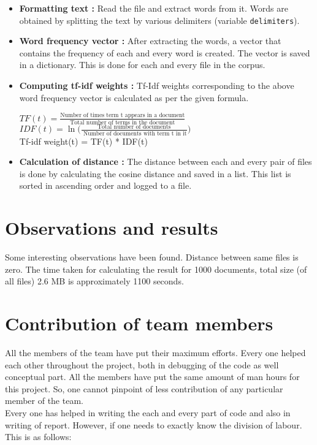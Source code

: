 \begin{itemize}
	\item \textbf{Formatting text :} Read the file and extract words from it. Words are obtained by splitting the text by various delimiters (variable \verb|delimiters|).
	\item \textbf{Word frequency vector :} After extracting the words, a vector that contains the frequency of each and every word is created. The vector is saved in a dictionary. This is done for each and every file in the corpus.
	\item \textbf{Computing tf-idf weights :} Tf-Idf weights corresponding to the above word frequency vector is calculated as per the given formula.
	\begin{center}
		$TF(t) = \frac{\text{Number of times term t appears in a document}}{\text{Total number of terms in the document}}$\\ 
		\vspace{1.2em}
		$IDF(t) = \ln \big( {\frac{\text{Total number of documents}}{\text{ Number of documents with term t in it}}} \big) $\\
		\vspace{1.2em}
		Tf-idf weight(t) = TF(t) * IDF(t)
	\end{center}
	\item \textbf{Calculation of distance :} The distance between each and every pair of files is done by calculating the cosine distance and saved in a list. This list is sorted in ascending order and logged to a file. 
\end{itemize}

\section{Observations and results}
\label{sec:p01}

Some interesting observations have been found. Distance between same files is zero. The time taken for calculating the result for 1000 documents, total size (of all files) 2.6 MB is approximately 1100 seconds.

\section{Contribution of team members}

All the  members of the team have put their maximum efforts. Every one helped each other throughout the project, both in debugging of the code as well conceptual part. All the members have put the same amount of man hours for this project. So, one cannot pinpoint of less contribution of any particular member of the team.\\
\indent Every one has helped in writing the each and every part of code and also in writing of report. However, if one needs to exactly know the division of labour. This is as follows:\\


